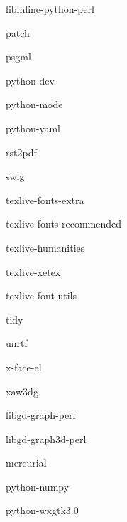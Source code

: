 \documentclass[12pt]{article}
\begin{document}
\begin{description}
\item libinline-python-perl

\item patch
\item psgml
\item python-dev
\item python-mode
\item python-yaml
\item rst2pdf
\item swig



\item texlive-fonts-extra
\item texlive-fonts-recommended
\item texlive-humanities
\item texlive-xetex
\item texlive-font-utils %


\item tidy
\item unrtf
\item x-face-el
\item xaw3dg



\item libgd-graph-perl
\item libgd-graph3d-perl


\item mercurial
\item python-numpy
\item python-wxgtk3.0


\end{description}
\end{document}
